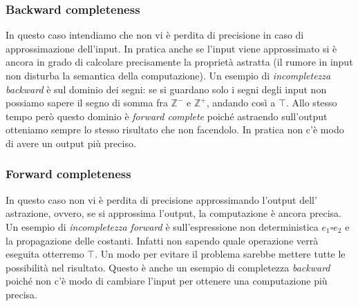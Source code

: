 \documentclass[a4paper,12pt,openany]{article}
\begin{document}
\subsubsection{Backward completeness}
In questo caso intendiamo che non vi è perdita di precisione in caso di approssimazione dell'input.
In pratica anche se l'input viene approssimato si è ancora in grado di calcolare precisamente la proprietà
astratta (il rumore in input non disturba la semantica della computazione).
\newline
Un esempio di \emph{incompletezza backward} è sul dominio dei segni: se si guardano solo i segni degli
input non possiamo sapere il segno di somma fra $\mathbb{Z}^-$ e $\mathbb{Z}^+$, andando così a $\top$. Allo stesso tempo
però questo dominio è \emph{forward complete} poiché astraendo sull'output otteniamo sempre lo stesso 
risultato che non facendolo. In pratica non c'è modo di avere un output più preciso.

\subsubsection{Forward completeness}
In questo caso non vi è perdita di precisione approssimando l'output dell' astrazione, ovvero, se si 
approssima l'output, la computazione è ancora precisa.
\newline
Un esempio di \emph{incompletezza forward} è sull'espressione non deterministica $e_1 \square e_2$ e la 
propagazione delle costanti. Infatti non sapendo quale operazione verrà eseguita otterremo $\top$. Un modo per
evitare il problema sarebbe mettere tutte le possibilità nel risultato. Questo è anche un esempio di 
completezza \emph{backward} poiché non c'è modo di cambiare l'input per ottenere una computazione più precisa.
\end{document}
